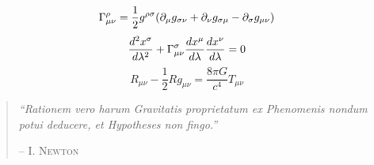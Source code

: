 \vspace*{1in}
{\LARGE
	\[
		\Gamma^\rho_{\mu\nu} = \frac{1}{2}g^{\rho\sigma}\qty(\partial_\mu g_{\sigma\nu} + \partial_\nu g_{\sigma\mu} - \partial_\sigma g_{\mu\nu}) \\[20pt]
	\]
	\[
		\dv[2]{x^\sigma}{\lambda} + \Gamma_{\mu\nu}^\sigma \dv{x^\mu}{\lambda} \dv{x^\nu}{\lambda} = 0\\[20pt]
	\]
	\[
		R_{\mu\nu} - \frac{1}{2}Rg_{\mu\nu} = \frac{8\pi G}{c^4}T_{\mu\nu}  
	\]
}

\vfill
{\large
\setlength{\leftmargin}{3cm}
\setlength{\rightmargin}{3cm}
\begin{quote}
	\textit{``Rationem vero harum Gravitatis proprietatum ex Phenomenis nondum potui deducere, et Hypotheses non fingo.''}

	\hfill -- \textsc{I. Newton}
\end{quote}
}
